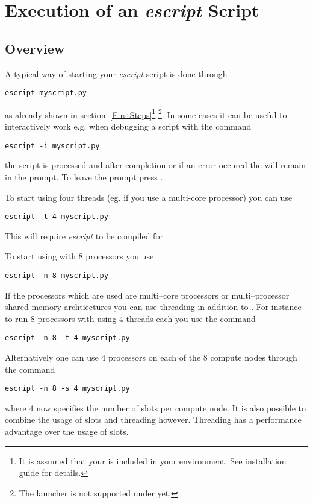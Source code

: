 \chapter{Execution of an {\it escript} Script}
\label{EXECUTION}

\section{Overview}
A typical way of starting your {\it escript} script  is done through 
\begin{verbatim}
escript myscript.py
\end{verbatim}
as already shown in section~\ref{FirstSteps}\footnote{It is assumed that your  is included in your  environment. See installation guide for details.}
\footnote{The  launcher is not supported under \WINDOWS yet.}. In some cases 
it can be useful to interactively work e.g. when debugging a script with the command 
\begin{verbatim}
escript -i myscript.py
\end{verbatim}
the script  is processed and after completion or if an error occured the 
 will remain in the \PYTHON prompt. To leave the prompt press .

To start 
 using four threads (eg. if you use a multi-core processor) you can use
\begin{verbatim}
escript -t 4 myscript.py
\end{verbatim}
This will require {\it escript} to be compiled for \OPENMP. 

To start  using \MPI with 8 processors you use
\begin{verbatim}
escript -n 8 myscript.py
\end{verbatim}
If the processors which are used are multi--core processors or multi--processor shared memory archtiectures you can use threading in addition to \MPI. For instance to run $8$ \MPI processors with using $4$ threads each you use the command
\begin{verbatim}
escript -n 8 -t 4 myscript.py
\end{verbatim}
Alternatively one can use $4$ \MPI processors on each of the $8$ compute nodes through the command
\begin{verbatim}
escript -n 8 -s 4 myscript.py
\end{verbatim}
where $4$ now specifies the number of slots per compute node. It is also possible 
to combine the usage of slots and threading however. Threading has a
performance advantage over the usage of slots. 

